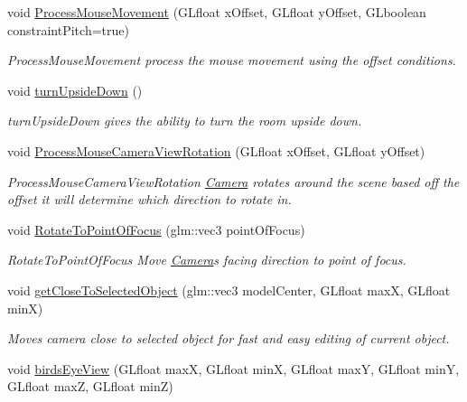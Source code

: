 \begin{DoxyCompactItemize}
void \hyperlink{class_camera_ad74e2911d43fe9f34f42499b5180a362}{Process\+Mouse\+Movement} (G\+Lfloat x\+Offset, G\+Lfloat y\+Offset, G\+Lboolean constraint\+Pitch=true)
\begin{DoxyCompactList}\small\item\em Process\+Mouse\+Movement process the mouse movement using the offset conditions. \end{DoxyCompactList}\item 
\hypertarget{class_camera_a7e93caf3e55100a7507714d7eeec223e}{}void \hyperlink{class_camera_a7e93caf3e55100a7507714d7eeec223e}{turn\+Upside\+Down} ()\label{class_camera_a7e93caf3e55100a7507714d7eeec223e}

\begin{DoxyCompactList}\small\item\em turn\+Upside\+Down gives the ability to turn the room upside down. \end{DoxyCompactList}\item 
void \hyperlink{class_camera_a58246ec7f4f0852005e09c8ab8f54642}{Process\+Mouse\+Camera\+View\+Rotation} (G\+Lfloat x\+Offset, G\+Lfloat y\+Offset)
\begin{DoxyCompactList}\small\item\em Process\+Mouse\+Camera\+View\+Rotation \hyperlink{class_camera}{Camera} rotates around the scene based off the offset it will determine which direction to rotate in. \end{DoxyCompactList}\item 
void \hyperlink{class_camera_aa8bb7760c16698825004048c4c033ada}{Rotate\+To\+Point\+Of\+Focus} (glm\+::vec3 point\+Of\+Focus)
\begin{DoxyCompactList}\small\item\em Rotate\+To\+Point\+Of\+Focus Move \hyperlink{class_camera}{Camera}\textquotesingle{}s facing direction to point of focus. \end{DoxyCompactList}\item 
\hypertarget{class_camera_a875c97e044ea5069d07476652d1cde41}{}void \hyperlink{class_camera_a875c97e044ea5069d07476652d1cde41}{get\+Close\+To\+Selected\+Object} (glm\+::vec3 model\+Center, G\+Lfloat max\+X, G\+Lfloat min\+X)\label{class_camera_a875c97e044ea5069d07476652d1cde41}

\begin{DoxyCompactList}\small\item\em Moves camera close to selected object for fast and easy editing of current object. \end{DoxyCompactList}\item 
\hypertarget{class_camera_a9f7fab48637e55f780cfbc55844cb611}{}void \hyperlink{class_camera_a9f7fab48637e55f780cfbc55844cb611}{birds\+Eye\+View} (G\+Lfloat max\+X, G\+Lfloat min\+X, G\+Lfloat max\+Y, G\+Lfloat min\+Y, G\+Lfloat max\+Z, G\+Lfloat min\+Z)\label{class_camera_a9f7fab48637e55f780cfbc55844cb611}


\end{DoxyCompactItemize}
